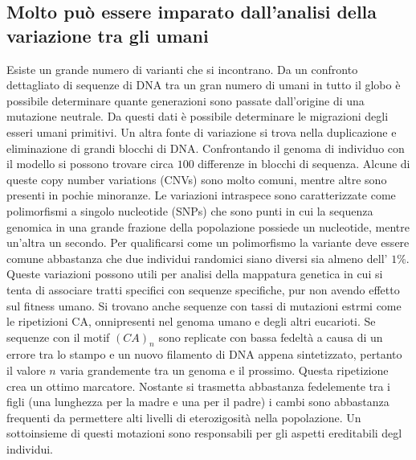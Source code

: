 \subsection{Molto pu\`o essere imparato dall'analisi della variazione tra gli umani}
Esiste un grande numero di varianti che si incontrano. Da un confronto dettagliato di sequenze di DNA tra un gran numero di umani in tutto il globo \`e possibile determinare quante 
generazioni sono passate dall'origine di una mutazione neutrale. Da questi dati \`e possibile determinare le migrazioni degli esseri umani primitivi. Un altra fonte di variazione si 
trova nella duplicazione e eliminazione di grandi blocchi di DNA. Confrontando il genoma di individuo con il modello si possono trovare circa $100$ differenze in blocchi di sequenza. 
Alcune di queste copy number variations (CNVs) sono molto comuni, mentre altre sono presenti in pochie minoranze. Le variazioni intraspece sono caratterizzate come polimorfismi a 
singolo nucleotide (SNPs) che sono punti in cui la sequenza genomica in una grande frazione della popolazione possiede un nucleotide, mentre un'altra un secondo. Per qualificarsi come 
un polimorfismo la variante deve essere comune abbastanza che due individui randomici siano diversi sia almeno dell' $1\%$. Queste variazioni possono utili per analisi della mappatura
genetica in cui si tenta di associare tratti specifici con sequenze specifiche, pur non avendo effetto sul fitness umano. Si trovano anche sequenze con tassi di mutazioni estrmi come
le ripetizioni CA, onnipresenti nel genoma umano e degli altri eucarioti. Se sequenze con il motif $(CA)_n$ sono replicate con bassa fedelt\`a a causa di un errore tra lo stampo e 
un nuovo filamento di DNA appena sintetizzato, pertanto il valore $n$ varia  grandemente tra un genoma e il prossimo. Questa ripetizione crea un ottimo marcatore. Nostante si trasmetta
abbastanza fedelemente tra i figli (una lunghezza per la madre e una per il padre) i cambi sono abbastanza frequenti da permettere alti livelli di eterozigosit\`a nella popolazione. 
Un sottoinsieme di questi motazioni sono responsabili per gli aspetti ereditabili degl individui.
